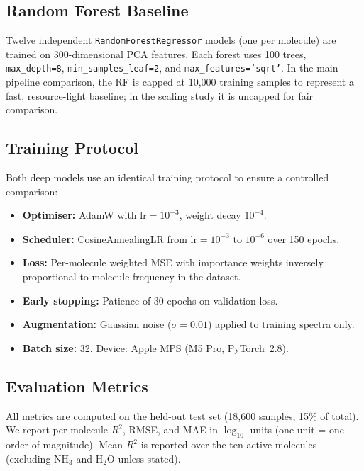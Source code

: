 \documentclass[11pt]{article}
\begin{document}
\subsection{Random Forest Baseline}
\label{sec:rf}

Twelve independent \texttt{RandomForestRegressor} models (one per molecule)
are trained on 300-dimensional PCA features. Each forest uses 100 trees,
\texttt{max\_depth=8}, \texttt{min\_samples\_leaf=2}, and
\texttt{max\_features='sqrt'}. In the main pipeline comparison, the RF is
capped at 10{,}000 training samples to represent a fast, resource-light
baseline; in the scaling study it is uncapped for fair comparison.

\subsection{Training Protocol}
\label{sec:training}

Both deep models use an identical training protocol to ensure a controlled
comparison:

\begin{itemize}
  \item \textbf{Optimiser:} AdamW \citep{loshchilov2019} with $\text{lr}=10^{-3}$,
        weight decay $10^{-4}$.
  \item \textbf{Scheduler:} CosineAnnealingLR \citep{loshchilov2017} from
        $\text{lr}=10^{-3}$ to $10^{-6}$ over 150 epochs.
  \item \textbf{Loss:} Per-molecule weighted MSE with importance weights
        inversely proportional to molecule frequency in the dataset.
  \item \textbf{Early stopping:} Patience of 30 epochs on validation loss.
  \item \textbf{Augmentation:} Gaussian noise ($\sigma=0.01$) applied to
        training spectra only.
  \item \textbf{Batch size:} 32. Device: Apple MPS (M5 Pro, PyTorch~2.8).
\end{itemize}

\subsection{Evaluation Metrics}

All metrics are computed on the held-out test set (18{,}600 samples, 15\% of
total). We report per-molecule $R^2$, RMSE, and MAE in $\log_{10}$ units
(one unit = one order of magnitude). Mean $R^2$ is reported over the ten active
molecules (excluding NH$_3$ and H$_2$O unless stated).
\end{document}
